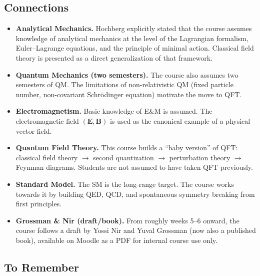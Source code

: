 \subsection*{Connections}

\begin{itemize}
  \item \textbf{Analytical Mechanics.}  Hochberg explicitly stated
    that the course assumes knowledge of analytical mechanics at the
    level of the Lagrangian formalism, Euler–Lagrange equations, and
    the principle of minimal action.  Classical field theory is
    presented as a direct generalization of that framework.
  \item \textbf{Quantum Mechanics (two semesters).}  The course also
    assumes two semesters of QM.  The limitations of non-relativistic
    QM (fixed particle number, non-covariant Schrödinger equation)
    motivate the move to QFT.
  \item \textbf{Electromagnetism.}  Basic knowledge of E\&M is
    assumed.  The electromagnetic field $(\mathbf{E}, \mathbf{B})$
    is used as the canonical example of a physical vector field.
  \item \textbf{Quantum Field Theory.}  This course builds a
    ``baby version'' of QFT: classical field theory $\to$ second
    quantization $\to$ perturbation theory $\to$ Feynman diagrams.
    Students are not assumed to have taken QFT previously.
  \item \textbf{Standard Model.}  The SM is the long-range target.
    The course works towards it by building QED, QCD, and spontaneous
    symmetry breaking from first principles.
  \item \textbf{Grossman \& Nir (draft/book).}  From roughly weeks
    5–6 onward, the course follows a draft by Yossi Nir and Yuval
    Grossman (now also a published book), available on Moodle as a
    PDF for internal course use only.
\end{itemize}

\subsection*{To Remember}


